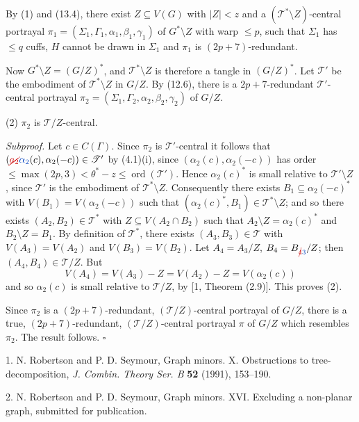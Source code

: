 By (1) and (13.4), there exist $Z \subseteq V(G)$ with $|Z| < z$ and a $(\mathscr{T}^* \setminus Z)$-central portrayal $\pi_1 = (\Sigma_1, \Gamma_1, \alpha_1, \beta_1, \gamma_1)$ of $G^* \setminus Z$ with warp $\le p$, such that $\Sigma_1$ has $\le q$ cuffs, $H$ cannot be drawn in $\Sigma_1$ and $\pi_1$ is $(2p + 7)$-redundant.

Now $G^* \setminus Z = (G/Z)^*$, and $\mathscr{T}^* \setminus Z$ is therefore a tangle in $(G/Z)^*$. Let $\mathscr{T}'$ be the embodiment of $\mathscr{T}^* \setminus Z$ in $G/Z$. By (12.6), there is a $2p + 7$-redundant $\mathscr{T}'$-central portrayal $\pi_2 = (\Sigma_1, \Gamma_2, \alpha_2, \beta_2, \gamma_2)$ of $G/Z$.

\hspace*{12pt}(2) $\pi_2$ is $\mathscr{T}/Z$-central.

\textit{Subproof.} Let $c \in C(\Gamma)$. Since $\pi_2$ is $\mathscr{T}'$-central it follows that $(\delm{a_2}\fix{\alpha_2}(c),\allowbreak \alpha_2(-c)) \in \mathscr{T}'$ by (4.1)(i), since $(\alpha_2(c), \alpha_2(-c))$ has order $\le \max(2p, 3) < \theta^* - z \le \operatorname{ord}(\mathscr{T}')$. Hence $\alpha_2(c)^*$ is small relative to $\mathscr{T}' \setminus Z$, since $\mathscr{T}'$ is the embodiment of $\mathscr{T}^* \setminus Z$. Consequently there exists $B_1 \subseteq \alpha_2(-c)^*$ with $V(B_1) = V(\alpha_2(-c))$ such that $(\alpha_2(c)^*, B_1) \in \mathscr{T}^* \setminus Z$; and so there exists $(A_2, B_2) \in \mathscr{T}^*$ with $Z \subseteq V(A_2 \cap B_2)$ such that $A_2 \setminus Z = \alpha_2(c)^*$ and $B_2 \setminus Z = B_1$. By definition of $\mathscr{T}^*$, there exists $(A_3, B_3) \in \mathscr{T}$ with $V(A_3) = V(A_2)$ and $V(B_3) = V(B_2)$. Let $A_4 = A_3/Z$, $B_4 = B_{\delm{4}\fix{3}}/Z$; then $(A_4, B_4) \in \mathscr{T}/Z$. But
\begin{equation*}
V(A_4) = V(A_3) - Z = V(A_2) - Z = V(\alpha_2(c))
\end{equation*}
and so $\alpha_2(c)$ is small relative to $\mathscr{T}/Z$, by [1, Theorem (2.9)]. This proves (2).

Since $\pi_2$ is a $(2p + 7)$-redundant, $(\mathscr{T}/Z)$-central portrayal of $G/Z$, there is a true, $(2p + 7)$-redundant, $(\mathscr{T}/Z)$-central portrayal $\pi$ of $G/Z$ which resembles $\pi_2$. The result follows. $\square$


1. N. Robertson and P. D. Seymour, Graph minors. X. Obstructions to tree-decomposition, \textit{J. Combin. Theory Ser. B} \textbf{52} (1991), 153--190.

2. N. Robertson and P. D. Seymour, Graph minors. XVI. Excluding a non-planar graph, submitted for publication.
